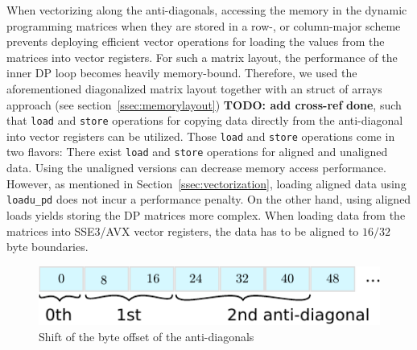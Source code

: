 \documentclass[runningheads,a4paper]{llncs}
\begin{document}
When vectorizing along the anti-diagonals, accessing the memory in the dynamic programming matrices when they are stored in a row-, or column-major scheme 
prevents deploying efficient vector operations for loading the values from the matrices into vector registers. 
For such a matrix layout, the performance of the inner DP loop becomes heavily memory-bound. 
Therefore, we used the aforementioned diagonalized matrix layout together with an struct of arrays approach (see section~\ref{ssec:memorylayout}) {\bf TODO: add cross-ref} {\bf done}, such that \texttt{load} and \texttt{store} operations for copying data directly from the anti-diagonal 
into vector registers can be utilized. 
Those \texttt{load} and \texttt{store} operations come in two flavors: There exist \texttt{load} and \texttt{store} operations for aligned and unaligned data. 
Using the unaligned versions can decrease memory access performance. However, 
as mentioned in Section~\ref{ssec:vectorization}, loading aligned data using \texttt{loadu\_pd} does not incur a performance penalty. 
On the other hand, using aligned loads yields storing the DP matrices more complex. 
When loading data from the matrices into SSE3/AVX vector registers, the data has to be aligned to $16/32$ byte boundaries.

\begin{figure}[ht!]
  \centering
  \includegraphics[scale=0.9]{figures/unaligned.pdf}
  \caption{Shift of the byte offset of the anti-diagonals}
  \label{fig:unaligned}
\end{figure}
\end{document}
